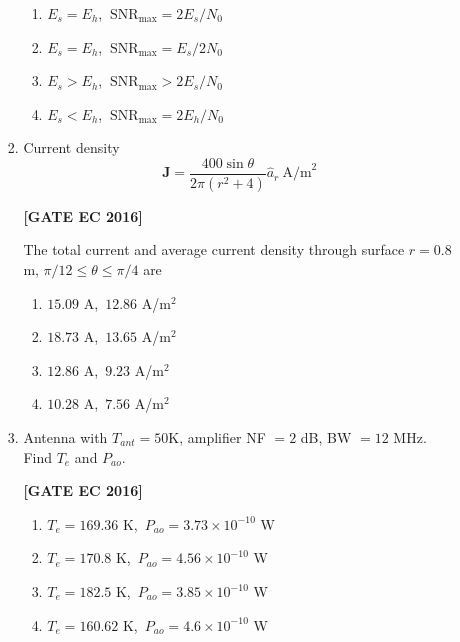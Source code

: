 \documentclass[12pt]{article}
\begin{document}
\begin{enumerate}[label=\textbf{Q.\arabic*.}, start=6, itemsep=2em]
\begin{enumerate}[label=\textbf{Q.\arabic*.}, start=26]
\begin{enumerate}[label=\textbf{Q.\arabic*.}, start=31]
\begin{multicols}{2}
    \begin{enumerate}
        \item $E_s = E_h$, $\ \mathrm{SNR}_{\max} = 2E_s/N_0$
        \item $E_s = E_h$, $\ \mathrm{SNR}_{\max} = E_s/2N_0$
        \item $E_s > E_h$, $\ \mathrm{SNR}_{\max} > 2E_s/N_0$
        \item $E_s < E_h$, $\ \mathrm{SNR}_{\max} = 2E_h/N_0$
    \end{enumerate}
\end{multicols}

\item Current density
\[
\mathbf{J} = \frac{400\sin\theta}{2\pi(r^{2}+4)}\hat{a}_r \ \text{A/m}^2
\]

\noindent \textbf{[GATE EC 2016]}

The total current and average current density through surface $r=0.8\,$m, $\pi/12 \le \theta \le \pi/4$ are

\begin{multicols}{2}
    \begin{enumerate}
        \item $15.09$ A,\ $12.86$ A/m$^2$
        \item $18.73$ A,\ $13.65$ A/m$^2$
        \item $12.86$ A,\ $9.23$ A/m$^2$
        \item $10.28$ A,\ $7.56$ A/m$^2$
    \end{enumerate}
\end{multicols}

\item Antenna with $T_{ant}=50$K, amplifier NF $=2$ dB, BW $=12$ MHz. Find $T_e$ and $P_{ao}$.

\noindent \textbf{[GATE EC 2016]}

\begin{multicols}{2}
    \begin{enumerate}
        \item $T_e=169.36$ K,\ $P_{ao}=3.73\times10^{-10}$ W
        \item $T_e=170.8$ K,\ $P_{ao}=4.56\times10^{-10}$ W
        \item $T_e=182.5$ K,\ $P_{ao}=3.85\times10^{-10}$ W
        \item $T_e=160.62$ K,\ $P_{ao}=4.6\times10^{-10}$ W
    \end{enumerate}
\end{multicols}


\end{enumerate}
\end{enumerate}
\end{enumerate}
\end{document}
